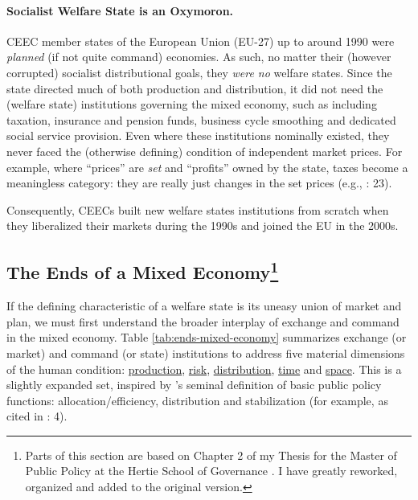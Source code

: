 \paragraph{Socialist Welfare State is an Oxymoron.}
\gls{CEEC} member states of the European Union (EU-27) up to around 1990 were \emph{planned} (if not quite command) economies.
As such, no matter their (however corrupted) socialist distributional goals, they \emph{were no} welfare states.
Since the state directed much of both production and distribution, it did not need the (welfare state) institutions governing the mixed economy, such as including taxation, insurance and pension funds, business cycle smoothing and dedicated social service provision. Even where these institutions nominally existed, they never faced the (otherwise defining) condition of independent market prices.
For example, where ``prices'' are \emph{set} and ``profits'' owned by the state, taxes become a meaningless category:
they are really just changes in the set prices (e.g., \citealt{Bonker2006}: 23).

Consequently, \glspl{CEEC} built new welfare states institutions from scratch when they liberalized their markets during the 1990s and joined the EU in the 2000s. %

\subsection[Ends]{The Ends of a Mixed Economy\footnote{
	Parts of this section are based on Chapter 2 of my Thesis for the Master of Public Policy at the Hertie School of Governance \citep{Held2010a}.
	I have greatly reworked, organized and added to the original version.}} \label{sec:ends}
If the defining characteristic of a welfare state is its uneasy union of market and plan, we must first understand the broader interplay of exchange and command in the mixed economy.
Table \ref{tab:ends-mixed-economy} summarizes exchange (or market) and command (or state) institutions to address five material dimensions of the human condition:
\hyperref[sec:production]{production}, \hyperref[sec:risk]{risk}, \hyperref[sec:distribution]{distribution}, \hyperref[sec:time]{time} and \hyperref[sec:space]{space}.
This is a slightly expanded set, inspired by \citeauthor{MusgThet1959}'s \citeyearpar{MusgThet1959} seminal definition of basic public policy functions:
allocation/efficiency, distribution and stabilization (for example, as cited in \citealt{Bordo2011}: 4).


